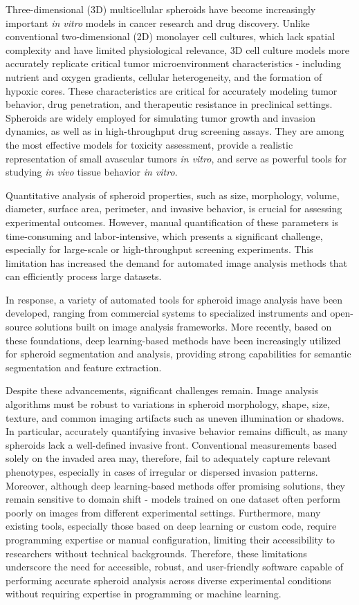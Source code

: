 \documentclass[preprint,12pt]{elsarticle}
\begin{document}
Three-dimensional (3D) multicellular spheroids have become increasingly important \textit{in vitro} models in cancer research and drug discovery. Unlike conventional two-dimensional (2D) monolayer cell cultures, which lack spatial complexity and have limited physiological relevance, 3D cell culture models more accurately replicate critical tumor microenvironment characteristics - including nutrient and oxygen gradients, cellular heterogeneity, and the formation of hypoxic cores. These characteristics are critical for accurately modeling tumor behavior, drug penetration, and therapeutic resistance in preclinical settings. Spheroids are widely employed for simulating tumor growth and invasion dynamics, as well as in high-throughput drug screening assays. They are among the most effective models for toxicity assessment, provide a realistic representation of small avascular tumors \textit{in vitro}, and serve as powerful tools for studying \textit{in vivo} tissue behavior \textit{in vitro}.

Quantitative analysis of spheroid properties, such as size, morphology, volume, diameter, surface area, perimeter, and invasive behavior, is crucial for assessing experimental outcomes. However, manual quantification of these parameters is time-consuming and labor-intensive, which presents a significant challenge, especially for large-scale or high-throughput screening experiments. This limitation has increased the demand for automated image analysis methods that can efficiently process large datasets.

In response, a variety of automated tools for spheroid image analysis have been developed, ranging from commercial systems to specialized instruments and open-source solutions built on image analysis frameworks. More recently, based on these foundations, deep learning-based methods have been increasingly utilized for spheroid segmentation and analysis, providing strong capabilities for semantic segmentation and feature extraction.

Despite these advancements, significant challenges remain. Image analysis algorithms must be robust to variations in spheroid morphology, shape, size, texture, and common imaging artifacts such as uneven illumination or shadows. In particular, accurately quantifying invasive behavior remains difficult, as many spheroids lack a well-defined invasive front. Conventional measurements based solely on the invaded area may, therefore, fail to adequately capture relevant phenotypes, especially in cases of irregular or dispersed invasion patterns. Moreover, although deep learning-based methods offer promising solutions, they remain sensitive to domain shift - models trained on one dataset often perform poorly on images from different experimental settings. Furthermore, many existing tools, especially those based on deep learning or custom code, require programming expertise or manual configuration, limiting their accessibility to researchers without technical backgrounds. Therefore, these limitations underscore the need for accessible, robust, and user-friendly software capable of performing accurate spheroid analysis across diverse experimental conditions without requiring expertise in programming or machine learning.
\end{document}
